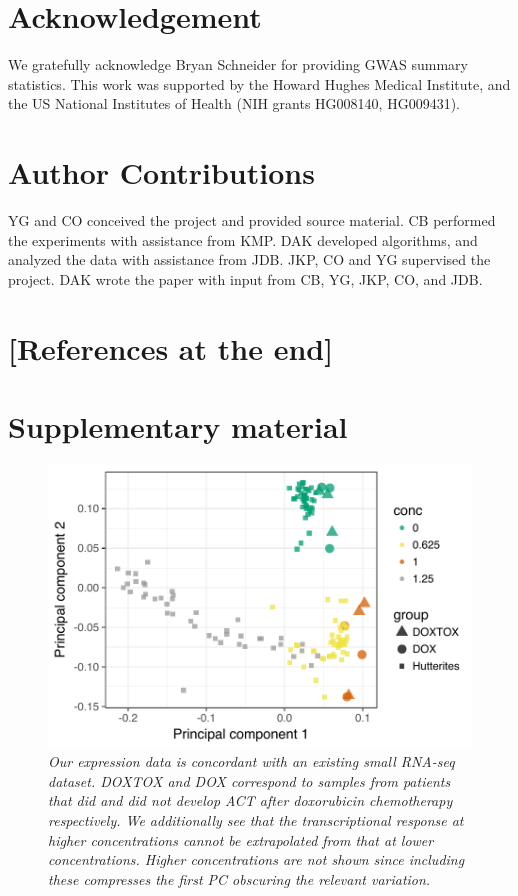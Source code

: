 \documentclass{article}
\begin{document}
\section*{Acknowledgement}

We gratefully acknowledge Bryan Schneider for providing GWAS summary statistics. This work was supported by the Howard Hughes Medical Institute, and the US National Institutes of Health (NIH grants HG008140, HG009431). 

\section*{Author Contributions}

YG and CO conceived the project and provided source material.
CB performed the experiments with assistance from KMP.
DAK developed algorithms, and analyzed the data with assistance from JDB.
JKP, CO and YG supervised the project.
DAK wrote the paper with input from CB, YG, JKP, CO, and JDB.

\section*{[References at the end]}
\newpage

%
%     

\setcounter{figure}{0}
\makeatletter 
\renewcommand{\thefigure}{S\@arabic\c@figure}

\section{Supplementary material} 

\begin{figure}[h]
\begin{center}
    \includegraphics[width=.6\textwidth]{../figures/burridge_comparison.pdf} %
    \caption{\it{Our expression data is concordant with an existing small RNA-seq dataset\citep{Burridge2016}. DOXTOX and DOX correspond to samples from patients that did and did not develop ACT after doxorubicin chemotherapy respectively. We additionally see that the transcriptional response at higher concentrations cannot be extrapolated from that at lower concentrations. Higher concentrations are not shown since including these compresses the first PC obscuring the relevant variation.}}
    \label{fig:burridge}
    \end{center}
\end{figure}
\end{document}
